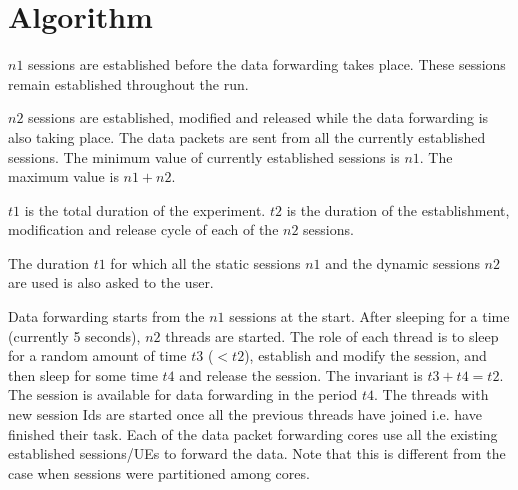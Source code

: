 \section{Algorithm}
$n1$ sessions are established before the data forwarding takes place. These sessions remain established throughout the run.

$n2$ sessions are established, modified and released while the data forwarding is also taking place. The data packets are sent from all the currently established sessions. The minimum value of currently established sessions is $n1$. The maximum value is $n1+n2$.

$t1$ is the total duration of the experiment.
$t2$ is the  duration of the establishment, modification and release cycle of each of the $n2$ sessions.

The duration $t1$ for which all the static sessions $n1$ and the dynamic sessions $n2$ are used is also asked to the user.

Data forwarding starts from the $n1$ sessions at the start. After sleeping for a time (currently 5
seconds), $n2$ threads are started. The role of each thread is to sleep for a random amount of time
$t3$ ($<t2$), establish and modify the session, and then sleep for some time $t4$ and release the
session. The invariant is $t3+t4= t2$.  The session is available for data forwarding in the period $t4$.  The threads with new session Ids are started once all the previous threads have joined i.e. have finished their task.
Each of the data packet forwarding cores use all the existing established sessions/UEs to forward the data. Note that this is different from the case when sessions were partitioned among cores.

